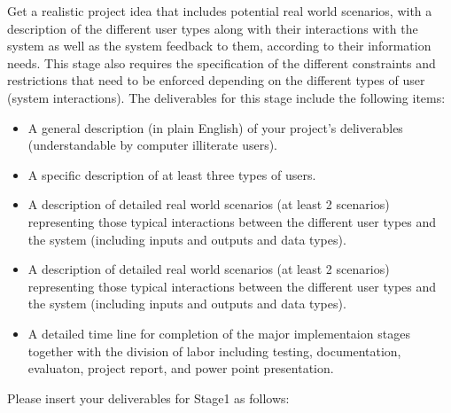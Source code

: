 \textnormal{
Get a realistic project idea that includes potential real world scenarios,
with a description of the different user types along with their interactions with the system 
as well as the system feedback to them, according to their information needs. 
This stage also requires the specification of the different constraints and restrictions
that need to be enforced depending on the different types of user (system interactions). 
The deliverables for this stage include the following items:
} 

\begin{itemize} 
\item{A general description (in plain English) of your project's deliverables (understandable by computer illiterate users).} 

\item{ A specific description of at least three types of users. }
	
\item{ A description of detailed real world scenarios (at least 2 scenarios) representing those typical interactions between the different user types and the system (including inputs and outputs and data types).}
	

\item{A description of detailed real world scenarios (at least 2 scenarios) representing those typical interactions between the different user types and the system (including inputs and outputs and data types). }

\item{A detailed time line for completion of the major implementaion stages together with the division of labor including testing, documentation, evaluaton, project report, and power point presentation.}

\end{itemize}

Please insert your deliverables for Stage1 as follows:


